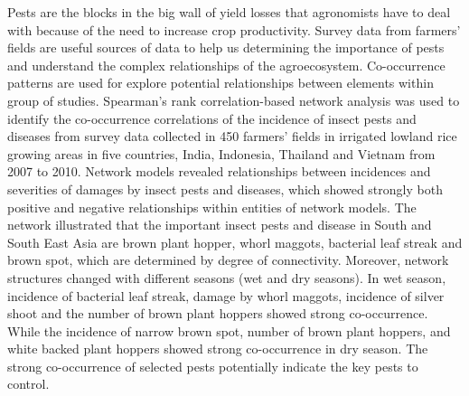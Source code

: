 \documentclass[12pt,a4paper]{article}
\begin{document}
Pests are the blocks in the big wall of yield losses that agronomists have to deal with because of the need to increase crop productivity. Survey data from farmers' fields are useful sources of data to help us determining the importance of pests and understand the complex relationships of the agroecosystem. Co-occurrence patterns are used for explore potential relationships between elements within group of studies. Spearman's rank correlation-based network analysis was used to identify the co-occurrence correlations of the incidence of insect pests and diseases from survey data collected in 450 farmers' fields in irrigated lowland rice growing areas in five countries, India, Indonesia, Thailand and Vietnam from 2007 to 2010. Network models revealed relationships between incidences and severities of damages by insect pests and diseases, which showed strongly both positive and negative relationships within entities of network models. The network illustrated that the important insect pests and disease in South and South East Asia are brown plant hopper, whorl maggots, bacterial leaf streak and brown spot, which are determined by degree of connectivity. Moreover, network structures changed with different seasons (wet and dry seasons). In wet season, incidence of bacterial leaf streak, damage by whorl maggots, incidence of silver shoot and the number of brown plant hoppers showed strong co-occurrence. While the incidence of narrow brown spot, number of brown plant hoppers, and white backed plant hoppers showed strong co-occurrence in dry season. The strong co-occurrence of selected pests potentially indicate the key pests to control. 
 
\end{document}
